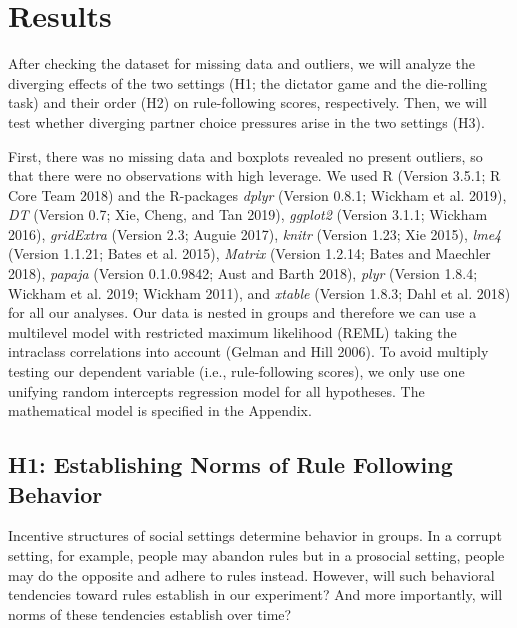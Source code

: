 \documentclass[man]{apa6}
\begin{document}
\hypertarget{results}{%
\section{Results}\label{results}}

After checking the dataset for missing data and outliers, we will
analyze the diverging effects of the two settings (H1; the dictator game
and the die-rolling task) and their order (H2) on rule-following scores,
respectively. Then, we will test whether diverging partner choice
pressures arise in the two settings (H3).

First, there was no missing data and boxplots revealed no present
outliers, so that there were no observations with high leverage. We used
R (Version 3.5.1; R Core Team 2018) and the R-packages \emph{dplyr}
(Version 0.8.1; Wickham et al. 2019), \emph{DT} (Version 0.7; Xie,
Cheng, and Tan 2019), \emph{ggplot2} (Version 3.1.1; Wickham 2016),
\emph{gridExtra} (Version 2.3; Auguie 2017), \emph{knitr} (Version 1.23;
Xie 2015), \emph{lme4} (Version 1.1.21; Bates et al. 2015),
\emph{Matrix} (Version 1.2.14; Bates and Maechler 2018), \emph{papaja}
(Version 0.1.0.9842; Aust and Barth 2018), \emph{plyr} (Version 1.8.4;
Wickham et al. 2019; Wickham 2011), and \emph{xtable} (Version 1.8.3;
Dahl et al. 2018) for all our analyses. Our data is nested in groups and
therefore we can use a multilevel model with restricted maximum
likelihood (REML) taking the intraclass correlations into account
(Gelman and Hill 2006). To avoid multiply testing our dependent variable
(i.e., rule-following scores), we only use one unifying random
intercepts regression model for all hypotheses. The mathematical model
is specified in the Appendix.

\hypertarget{h1-establishing-norms-of-rule-following-behavior}{%
\subsection{H1: Establishing Norms of Rule Following
Behavior}\label{h1-establishing-norms-of-rule-following-behavior}}

Incentive structures of social settings determine behavior in groups. In
a corrupt setting, for example, people may abandon rules but in a
prosocial setting, people may do the opposite and adhere to rules
instead. However, will such behavioral tendencies toward rules establish
in our experiment? And more importantly, will norms of these tendencies
establish over time?
\end{document}
